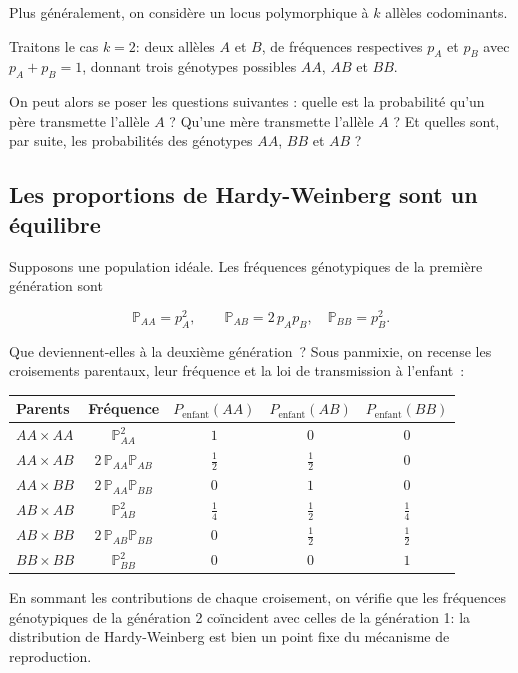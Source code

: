 Plus généralement, on considère un locus polymorphique à $k$ allèles codominants.

Traitons le cas $k = 2$: deux allèles $A$ et $B$, de fréquences respectives $p_A$ et $p_B$ avec $p_A + p_B = 1$, donnant trois génotypes possibles $AA$, $AB$ et $BB$.

On peut alors se poser les questions suivantes : quelle est la probabilité qu'un père transmette l'allèle $A$ ? Qu'une mère transmette l'allèle $A$ ? Et quelles sont, par suite, les probabilités des génotypes $AA$, $BB$ et $AB$ ?

\subsection{Les proportions de Hardy-Weinberg sont un équilibre}

Supposons une population idéale. Les fréquences génotypiques de la première génération sont

$$
\mathbb{P}_{AA} = p_A^2, \qquad \mathbb{P}_{AB} = 2\, p_A p_B, \quad \mathbb{P}_{BB} = p_B^2 .
$$

Que deviennent-elles à la deuxième génération~? Sous panmixie, on recense les croisements parentaux, leur fréquence et la loi de transmission à l'enfant~:

\begin{center}
\begin{tabular}{lcccc}
\hline
Parents & Fréquence & $P_{\text{enfant}}(AA)$ & $P_{\text{enfant}}(AB)$
        & $P_{\text{enfant}}(BB)$ \\
\hline
$AA \times AA$ & $\mathbb{P}_{AA}^2$              & $1$           & $0$           & $0$ \\
$AA \times AB$ & $2\,\mathbb{P}_{AA}\mathbb{P}_{AB}$ & $\tfrac{1}{2}$ & $\tfrac{1}{2}$ & $0$ \\
$AA \times BB$ & $2\,\mathbb{P}_{AA}\mathbb{P}_{BB}$ & $0$           & $1$           & $0$ \\
$AB \times AB$ & $\mathbb{P}_{AB}^2$              & $\tfrac{1}{4}$ & $\tfrac{1}{2}$ & $\tfrac{1}{4}$ \\
$AB \times BB$ & $2\,\mathbb{P}_{AB}\mathbb{P}_{BB}$ & $0$           & $\tfrac{1}{2}$ & $\tfrac{1}{2}$ \\
$BB \times BB$ & $\mathbb{P}_{BB}^2$              & $0$           & $0$           & $1$ \\
\hline
\end{tabular}
\end{center}

En sommant les contributions de chaque croisement, on vérifie que les fréquences génotypiques de la génération 2 coïncident avec celles de la génération 1: la distribution de Hardy-Weinberg est bien un point fixe du mécanisme de reproduction.

